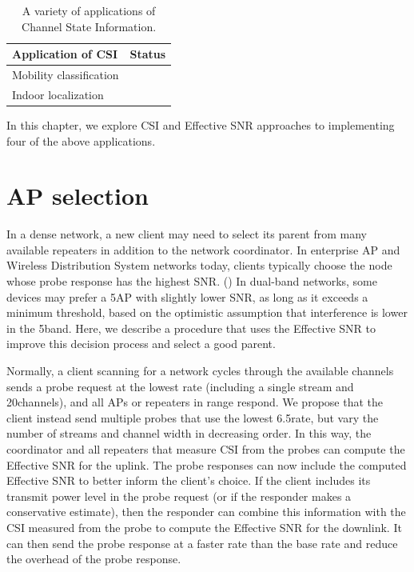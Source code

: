\begin{table}[htp]
	\centering
	\begin{tabular}{lc}
	\toprule
		\textbf{Application of CSI} & \textbf{Status} \\
	\midrule
		Mobility classification & \secref{sec:esnr_mobility}\\
		Indoor localization \\
	\bottomrule
	\end{tabular}
	\caption{\label{tab:csi_uses}A variety of applications of Channel State Information.}
\end{table}

In this chapter, we explore CSI and Effective SNR approaches to implementing four of the above applications.


\section{AP selection}\label{sec:esnr_apsel}
In a dense network, a new client may need to select its parent from many available repeaters in addition to the network coordinator. In enterprise AP and Wireless Distribution System networks today, clients typically choose the node whose probe response has the highest SNR\@. () In dual-band networks, some devices may prefer a 5\GHz AP with slightly lower SNR, as long as it exceeds a minimum threshold, based on the optimistic assumption that interference is lower in the 5\GHz band. Here, we describe a procedure that uses the Effective SNR to improve this decision process and select a good parent.

Normally, a client scanning for a network cycles through the available channels sends a probe request at the lowest rate (including a single stream and 20\MHz channels), and all APs or repeaters in range respond. We propose that the client instead send multiple probes that use the lowest 6.5\Mbps rate, but vary the number of streams and channel width in decreasing order. In this way, the coordinator and all repeaters that measure CSI from the probes can compute the Effective SNR for the uplink. The probe responses can now include the computed Effective SNR to better inform the client's choice. If the client includes its transmit power level in the probe request (or if the responder makes a conservative estimate), then the responder can combine this information with the CSI measured from the probe to compute the Effective SNR for the downlink. It can then send the probe response at a faster rate than the base rate and reduce the overhead of the probe response.

